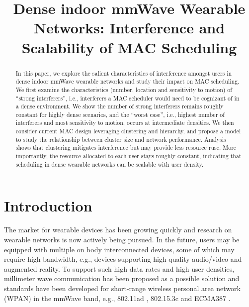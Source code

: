 \documentclass[10pt, conference, letterpaper]{IEEEtran}
\begin{document}
\title{Dense indoor mmWave Wearable Networks: Interference and Scalability of MAC Scheduling}

\author{
}

\maketitle

\begin{abstract}

In this paper, we explore the salient characteristics of interference amongst users in dense indoor mmWave wearable networks and study their impact on MAC scheduling.
We first examine the characteristics (number, location and sensitivity to motion) of ``strong interferers'', i.e., interferers a MAC scheduler would need to be cognizant of in a dense environment.
We show the number of strong interferers remains roughly constant for highly dense scenarios, and the ``worst case'', i.e., highest number of interferers and most sensitivity to motion, occurs at intermediate densities.
We then consider current MAC design leveraging clustering and hierarchy, and propose a model to study the relationship between cluster size and network performance.
Analysis shows that clustering mitigates interference but may provide less resource ruse.
More importantly, the resource allocated to each user stays roughly constant, indicating that scheduling in dense wearable networks can be scalable with user density.

\end{abstract}
\IEEEpeerreviewmaketitle

\section{Introduction}\label{section:introduction}
The market for wearable devices has been growing quickly \cite{wearable} and research on wearable networks is now actively being pursued. 
In the future, users may be equipped with multiple on body interconnected devices, some of which may require high bandwidth, e.g., devices supporting high quality audio/video and augmented reality. 
To support such high data rates and high user densities, millimeter wave communication has been proposed as a possible solution and standards have been developed for short-range wireless personal area network (WPAN) in the mmWave band, e.g., 802.11ad \cite{80211ad}, 802.15.3c \cite{802153c} and ECMA387 \cite{ECMA387}.
\end{document}
